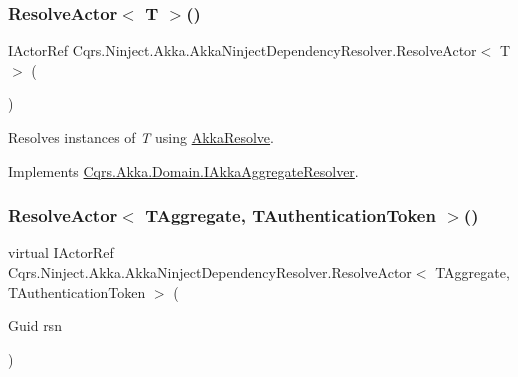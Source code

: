 \subsubsection{\texorpdfstring{Resolve\+Actor$<$ T $>$()}{ResolveActor< T >()}}
{\footnotesize\ttfamily I\+Actor\+Ref Cqrs.\+Ninject.\+Akka.\+Akka\+Ninject\+Dependency\+Resolver.\+Resolve\+Actor$<$ T $>$ (\begin{DoxyParamCaption}{ }\end{DoxyParamCaption})}



Resolves instances of {\itshape T}  using \hyperlink{classCqrs_1_1Ninject_1_1Akka_1_1AkkaNinjectDependencyResolver_a8e55618bf89a2c14bc3d0e7b3253f17d_a8e55618bf89a2c14bc3d0e7b3253f17d}{Akka\+Resolve}. 



Implements \hyperlink{interfaceCqrs_1_1Akka_1_1Domain_1_1IAkkaAggregateResolver_a9c3e3f9e8a963ea0b11e79f9eb1c55a9_a9c3e3f9e8a963ea0b11e79f9eb1c55a9}{Cqrs.\+Akka.\+Domain.\+I\+Akka\+Aggregate\+Resolver}.

\mbox{\label{classCqrs_1_1Ninject_1_1Akka_1_1AkkaNinjectDependencyResolver_ab5ba20875aab8764bbb7d6df61722436_ab5ba20875aab8764bbb7d6df61722436}} 
\subsubsection{\texorpdfstring{Resolve\+Actor$<$ T\+Aggregate, T\+Authentication\+Token $>$()}{ResolveActor< TAggregate, TAuthenticationToken >()}}
{\footnotesize\ttfamily virtual I\+Actor\+Ref Cqrs.\+Ninject.\+Akka.\+Akka\+Ninject\+Dependency\+Resolver.\+Resolve\+Actor$<$ T\+Aggregate, T\+Authentication\+Token $>$ (\begin{DoxyParamCaption}\item[{Guid}]{rsn }\end{DoxyParamCaption})\hspace{0.3cm}{\ttfamily [virtual]}}



